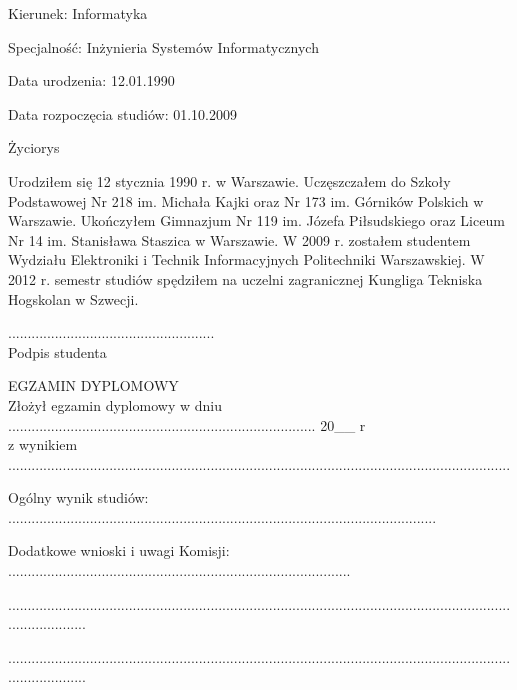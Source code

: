 \documentclass[../thesis.tex]{subfiles}
\begin{document}
\begin{flushleft}
\fontsize{12pt}{30pt}\selectfont

\vspace*{6mm}
\hspace{5cm} Kierunek: \hspace{15mm} Informatyka

\hspace{5cm} Specjalność: \hspace{10mm} Inżynieria Systemów Informatycznych

\hspace{5cm} Data urodzenia: \hspace{51mm} 12.01.1990

\hspace{5cm} Data rozpoczęcia studiów: \hspace{33mm} 01.10.2009
\vspace{1.5cm}

\begin{center}
Życiorys
\end{center}
Urodziłem się 12 stycznia 1990 r. w Warszawie. Uczęszczałem do Szkoły Podstawowej Nr 218 im. Michała Kajki oraz Nr 173 im. Górników Polskich w Warszawie. Ukończyłem Gimnazjum Nr 119 im. Józefa Piłsudskiego oraz Liceum Nr 14 im. Stanisława Staszica w Warszawie. W 2009 r. zostałem studentem Wydziału Elektroniki i Technik Informacyjnych Politechniki Warszawskiej. W 2012 r. semestr studiów spędziłem na uczelni zagranicznej Kungliga Tekniska Hogskolan w Szwecji.
\vspace{1cm}

\fontsize{12pt}{14pt}\selectfont
\hspace*{100mm}..................................................... \\
\hspace*{115mm}Podpis studenta
\vspace*{1cm}

\fontsize{12pt}{30pt}\selectfont
EGZAMIN DYPLOMOWY \\
Złożył egzamin dyplomowy w dniu ............................................................................... 20\_\_ r \\

z wynikiem .................................................................................................................................

Ogólny wynik studiów: ..............................................................................................................

Dodatkowe wnioski i uwagi Komisji: ........................................................................................

.....................................................................................................................................................

.....................................................................................................................................................

\end{flushleft}
\pagestyle{empty}
\cleardoublepage 
\end{document}
